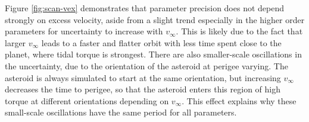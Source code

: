 \documentclass[fleqn,usenatbib]{mnras}
\begin{document}
Figure \ref{fig:scan-vex} demonstrates that parameter precision does not depend strongly on excess velocity, aside from a slight trend especially in the higher order parameters for uncertainty to increase with $v_\infty$. This is likely due to the fact that larger $v_\infty$ leads to a faster and flatter orbit with less time spent close to the planet, where tidal torque is strongest. There are also smaller-scale oscillations in the uncertainty, due to the orientation of the asteroid at perigee varying. The asteroid is always simulated to start at the same orientation, but increasing $v_\infty$ decreases the time to perigee, so that the asteroid enters this region of high torque at different orientations depending on $v_\infty$. This effect explains why these small-scale oscillations have the same period for all parameters.
\end{document}

